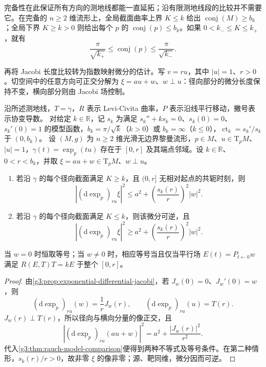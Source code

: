 完备性在此保证所有方向的测地线都能一直延拓；沿有限测地线段的比较并不需要它。在完备的 \(n\ge2\) 维流形上，全局截面曲率上界 \(K\le k\) 给出 \(\operatorname{conj}(M)\ge b_k\)；全局下界 \(K\ge k>0\) 则给出每个 \(p\) 的 \(\operatorname{conj}(p)\le b_k\)。如果 \(0<k_-\le K\le k_+\)，就有
\[
	\frac{\pi}{\sqrt{k_+}}
	\le\operatorname{conj}(p)
	\le\frac{\pi}{\sqrt{k_-}}.
\]

\ProseParagraphBreak

再将 Jacobi 长度比较转为指数映射微分的估计。写 \(v=ru\)，其中 \(|u|=1\)、\(r>0\)。切空间中的任意方向可正交分解为 \(\xi=au+w\)、\(w\perp u\)：径向部分的微分长度保持不变，横向部分则由 Jacobi 场控制。

\begin{proposition}\label{g3:prop:exponential-length-comparison}
	沿所述测地线，\(T=\dot\gamma\)，\(R\) 表示 Levi-Civita 曲率，\(P\) 表示沿线平行移动，撇号表示协变导数。
	对给定 \(k\in\mathbb R\)，记 \(s_k\) 为满足 \(s_k''+ks_k=0\)、\(s_k(0)=0\)、\(s_k'(0)=1\) 的模型函数，\(b_k=\pi/\sqrt k\)（\(k>0\)）或 \(b_k=\infty\)（\(k\le0\)），\(\operatorname{ct}_k=s_k'/s_k\) 于 \((0,b_k)\)。
	设 \((M,g)\) 为 \(n\ge2\) 维光滑无边界黎曼流形，\(p\in M\)、\(u\in \mathrm{T}_pM\)、\(|u|=1\)，\(\gamma(t)=\exp_p(tu)\) 存在于 \([0,r]\) 及其端点邻域。设 \(k\in\mathbb R\)、\(0<r<b_k\)，并取 \(\xi=au+w\in \mathrm{T}_pM\)、\(w\perp u\)。
	\begin{enumerate}
		\item 若沿 \(\gamma\) 的每个径向截面满足 \(K\ge k\)，且 \((0,r]\) 无相对起点的共轭时刻，则
		\begin{equation}\label{g3:eq:exponential-length-upper}
			| (\mathrm d\exp_p)_{ru}\xi |^2
			\le a^2+\left(\frac{s_k(r)}r\right)^2|w|^2.
		\end{equation}
		\item 若沿 \(\gamma\) 的每个径向截面满足 \(K\le k\)，则该微分可逆，且
		\begin{equation}\label{g3:eq:exponential-length-lower}
			| (\mathrm d\exp_p)_{ru}\xi |^2
			\ge a^2+\left(\frac{s_k(r)}r\right)^2|w|^2.
		\end{equation}
	\end{enumerate}
	当 \(w=0\) 时恒取等号；当 \(w\ne0\) 时，相应等号当且仅当平行场 \(E(t)=P_{t\leftarrow0}w\) 满足 \(R(E,T)T=kE\) 于整个 \([0,r]\)。
\end{proposition}
\begin{proof}
	由\cref{g3:prop:exponential-differential-jacobi}，若 \(J_w(0)=0\)、\(J_w'(0)=w\)，则
	\[
		(\mathrm d\exp_p)_{ru}(w)=\frac1rJ_w(r),
		\qquad (\mathrm d\exp_p)_{ru}(u)=T(r).
	\]
	\(J_w(r)\perp T(r)\)，所以径向与横向分量的像正交，且
	\[
		| (\mathrm d\exp_p)_{ru}(au+w) |^2
		=a^2+\frac{|J_w(r)|^2}{r^2}.
	\]
	代入\cref{g3:thm:rauch-model-comparison}便得到两种不等式及等号条件。在第二种情形，\(s_k(r)/r>0\)，故非零 \(\xi\) 的像非零；源、靶同维，微分因而可逆。
\end{proof}

